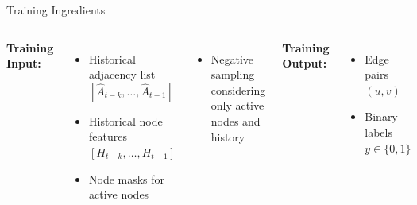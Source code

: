 \documentclass[aspectratio=169,xcolor=dvipsnames]{beamer}
\begin{document}
\begin{frame}{Training Ingredients }


	\begin{columns}[c]
		\centering
		\textbf{Training Input:}
		\begin{itemize}
			\item Historical adjacency list $[\hat{A}_{t-k}, \ldots, \hat{A}_{t-1}]$
			\item Historical node features $[H_{t-k}, \ldots, H_{t-1}]$
			\item Node masks for active nodes
		\end{itemize}
		\vspace{2em}
		\begin{itemize}
			\item Negative sampling considering only active nodes and history
		\end{itemize}

		\centering
		\textbf{Training Output:}
		\begin{itemize}
			\item Edge pairs $(u, v)$
			\item Binary labels $y \in \{0, 1\}$
		\end{itemize}
		\vspace{2em}
	\end{columns}
\end{frame}
\end{document}
